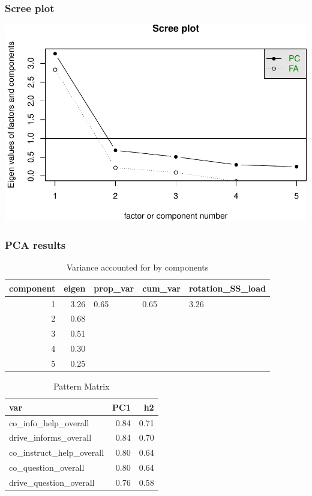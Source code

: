 \documentclass[]{article}
\begin{document}
\hypertarget{scree-plot-1}{%
\subsubsection{Scree plot}\label{scree-plot-1}}

\includegraphics{strategy_comms_files/figure-latex/unnamed-chunk-10-1.pdf}

\hypertarget{pca-results-1}{%
\subsubsection{PCA results}\label{pca-results-1}}

\begin{table}[H]

\caption{\label{tab:unnamed-chunk-11}Variance accounted for by components}
\centering
\fontsize{6}{8}\selectfont
\begin{tabular}[t]{rrlll}
\toprule
component & eigen & prop\_var & cum\_var & rotation\_SS\_load\\
\midrule
1 & 3.26 & 0.65 & 0.65 & 3.26\\
2 & 0.68 &  &  & \\
3 & 0.51 &  &  & \\
4 & 0.30 &  &  & \\
5 & 0.25 &  &  & \\
\bottomrule
\end{tabular}
\end{table}

\begin{table}[H]

\caption{\label{tab:unnamed-chunk-11}Pattern Matrix}
\centering
\fontsize{6}{8}\selectfont
\begin{tabular}[t]{lrr}
\toprule
var & PC1 & h2\\
\midrule
co\_info\_help\_overall & 0.84 & 0.71\\
drive\_informs\_overall & 0.84 & 0.70\\
co\_instruct\_help\_overall & 0.80 & 0.64\\
co\_question\_overall & 0.80 & 0.64\\
drive\_question\_overall & 0.76 & 0.58\\
\bottomrule
\end{tabular}
\end{table}
\end{document}
